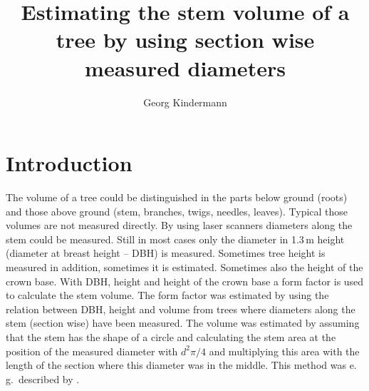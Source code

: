 \documentclass[twocolumn]{scrartcl}
\title{Estimating the stem volume of a tree by using section wise measured diameters}
\author{Georg Kindermann}
\begin{document}

\tableofcontents

\section{Introduction}

The volume of a tree could be distinguished in the parts below ground (roots)
and those above ground (stem, branches, twigs, needles, leaves). Typical those
volumes are not measured directly. By using laser scanners diameters along the
stem could be measured. Still in most cases only the diameter in 1.3\,m height
(diameter at breast height -- DBH) is measured. Sometimes tree height is
measured in addition, sometimes it is estimated. Sometimes also the height of
the crown base. With DBH, height and height of the crown base a form factor is
used to calculate the stem volume. The form factor was estimated by using the
relation between DBH, height and volume from trees where diameters along the
stem (section wise) have been measured. The volume was estimated by assuming
that the stem has the shape of a circle and calculating the stem area at the
position of the measured diameter with $d^2 \pi/4$ and multiplying this area
with the length of the section where this diameter was in the middle. This
method was e.\,g.\ described by
\cite{huber1839volumen,kruenitz1781encyclopaedie,kaestner1766mathematische}.
\end{document}
